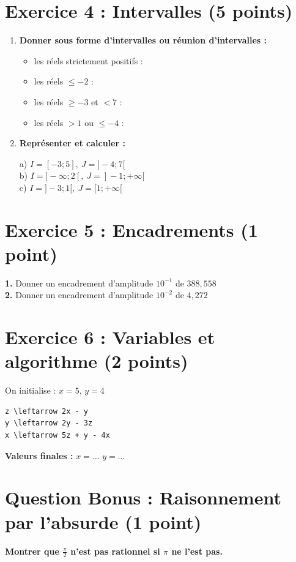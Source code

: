 \documentclass[12pt,a4paper]{article}
\begin{document}
\section*{Exercice 4 : Intervalles (5 points)}
\begin{enumerate}
    \item \textbf{Donner sous forme d'intervalles ou r\'eunion d'intervalles :}
    \begin{tcolorbox}[colframe=black, colback=white, width=\linewidth, height=4cm]
    \begin{itemize}
        \item les r\'eels strictement positifs : \\
        \item les r\'eels \(\leq -2\) : \\
        \item les r\'eels \(\geq -3\) et \(< 7\) : \\
        \item les r\'eels \(>1\) ou \(\leq -4\) :
    \end{itemize}
    \end{tcolorbox}

    \item \textbf{Repr\'esenter et calculer :} 
    \begin{tcolorbox}[colframe=black, colback=white, width=\linewidth, height=6cm]
    a) \(I = [-3 ; 5],\ J = ]-4 ; 7[\) \\
    b) \(I = ]-\infty ; 2[ ,\ J = ]-1 ; +\infty[\) \\
    c) \(I = ]-3 ; 1[ ,\ J = [1 ; +\infty[\)
    \end{tcolorbox}
\end{enumerate}

\section*{Exercice 5 : Encadrements (1 point)}
\begin{tcolorbox}[colframe=black, colback=white, width=\linewidth, height=4cm]
\textbf{1.} Donner un encadrement d’amplitude \(10^{-1}\) de \(388{,}558\) \\
\textbf{2.} Donner un encadrement d’amplitude \(10^{-2}\) de \(4{,}272\)
\end{tcolorbox}

\section*{Exercice 6 : Variables et algorithme (2 points)}
\noindent On initialise : \(x = 5\), \(y = 4\)
\begin{verbatim}
z \leftarrow 2x - y
y \leftarrow 2y - 3z
x \leftarrow 5z + y - 4x
\end{verbatim}
\begin{tcolorbox}[colframe=black, colback=white, width=\linewidth, height=3cm]
\textbf{Valeurs finales :} \quad \(x = \ldots\) \quad \(y = \ldots\)
\end{tcolorbox}

\section*{Question Bonus : Raisonnement par l’absurde (1 point)}
\begin{tcolorbox}[colframe=black, colback=white, width=\linewidth, height=5cm]
\textbf{Montrer que \(\frac{\pi}{2}\) n’est pas rationnel si \(\pi\) ne l’est pas.}
\end{tcolorbox}
\end{document}
